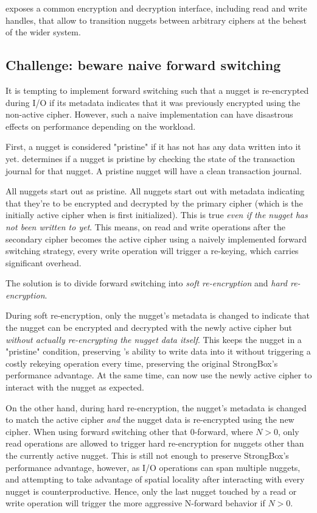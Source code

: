\SYSTEM{} exposes a common encryption and decryption interface, including read
and write handles, that allow \SYSTEM{} to transition nuggets between arbitrary
ciphers at the behest of the wider system.

\subsection{Challenge: beware naive forward switching}

It is tempting to implement forward switching such that a nugget is re-encrypted
during I/O if its metadata indicates that it was previously encrypted using the
non-active cipher. However, such a naive implementation can have disastrous
effects on performance depending on the workload.

First, a nugget is considered "pristine" if it has not has any data written into
it yet. \SYSTEM{} determines if a nugget is pristine by checking the state of
the transaction journal for that nugget. A pristine nugget will have a clean
transaction journal.

All nuggets start out as pristine. All nuggets start out with metadata
indicating that they're to be encrypted and decrypted by the primary cipher
(which is the initially active cipher when \SYSTEM{} is first initialized). This
is true \emph{even if the nugget has not been written to yet}. This means, on
read and write operations after the secondary cipher becomes the active cipher
using a naively implemented forward switching strategy, every write operation
will trigger a re-keying, which carries significant overhead.

The solution is to divide forward switching into \emph{soft re-encryption} and
\emph{hard re-encryption}.

During soft re-encryption, only the nugget's metadata is changed to indicate
that the nugget can be encrypted and decrypted with the newly active cipher but
\emph{without actually re-encrypting the nugget data itself}. This keeps the
nugget in a "pristine" condition, preserving \SYSTEM{}'s ability to write data
into it without triggering a costly rekeying operation every time, preserving
the original StrongBox's performance advantage. At the same time, \SYSTEM{} can
now use the newly active cipher to interact with the nugget as expected.

On the other hand, during hard re-encryption, the nugget's metadata is changed
to match the active cipher \emph{and} the nugget data is re-encrypted using the
new cipher. When using forward switching other that 0-forward, 
where $N > 0$, only read operations are allowed to trigger hard re-encryption
for nuggets other than the currently active nugget. This is still not enough to
preserve StrongBox's performance advantage, however, as I/O operations can span
multiple nuggets, and attempting to take advantage of spatial locality after
interacting with every nugget is counterproductive. Hence, only the last nugget
touched by a read or write operation will trigger the more aggressive N-forward
behavior if $N > 0$.

